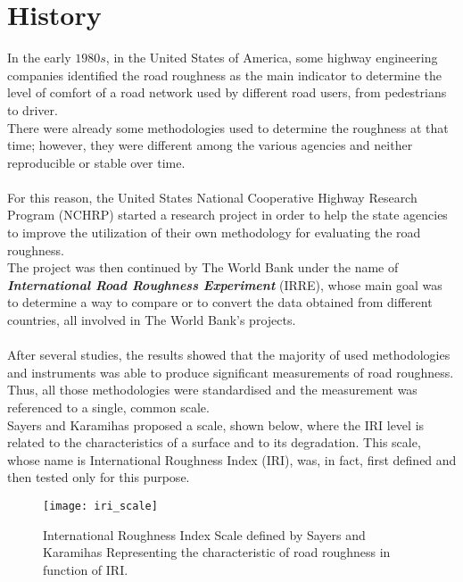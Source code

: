 \documentclass{standalone}
\begin{document}
\section{History}\label{IRI_History}
\noindent In the early $1980s$, in the United States of America, some highway engineering companies identified the road roughness as the main indicator to determine the level of comfort of a road network used by different road users, from pedestrians to driver. \\There were already some methodologies used to determine the roughness at that time; however, they were different among the various agencies and neither reproducible or stable over time.\\\\
For this reason, the United States National Cooperative Highway Research Program (NCHRP) started a research project in order to help the state agencies to improve the utilization of their own methodology for evaluating the road roughness\cite{gillespie1980calibration}.\\The project was then continued by The World Bank\cite{sayers1986guidelines} under the name of \textbf{\textit{International Road Roughness Experiment}} (IRRE)\cite{sayers1986internationalscale}, whose main goal was to determine a way to compare or to convert the data obtained from different countries, all involved in The World Bank's projects.\\\\
After several studies, the results showed that the majority of used methodologies and instruments was able to produce significant measurements\cite{sayers1986international} of road roughness. Thus, all those methodologies were standardised and the measurement was referenced to a single, common scale.\\
Sayers and Karamihas \cite{little_book} proposed a scale, shown below, where the IRI level is related to the characteristics of a surface and to its degradation. This scale, whose name is International Roughness Index (IRI), was, in fact, first defined and then tested only for this purpose.
\\
\begin{figure}[ht]
\texttt{[image: iri\_scale]}
\caption{International Roughness Index Scale defined by Sayers and Karamihas \cite{little_book}
Representing the characteristic of road roughness in function of IRI.}
\label{fig:International Roughness Index Scale}
\end{figure}
\clearpage
\end{document}
